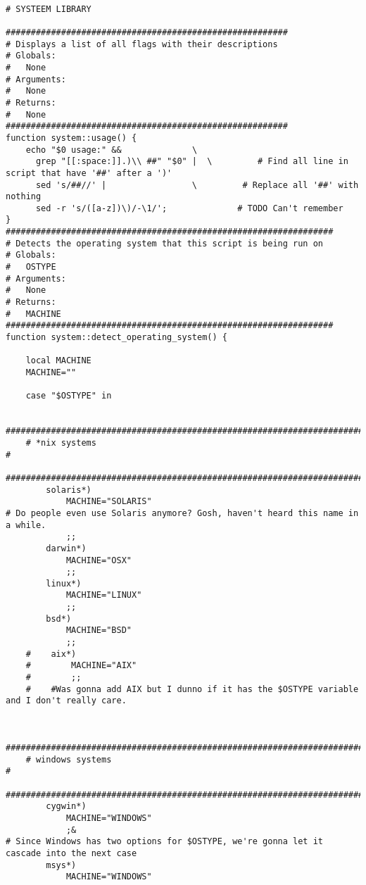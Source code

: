 \documentclass[11pt]{article}
\begin{document}
\begin{verbatim}

# SYSTEEM LIBRARY

########################################################
# Displays a list of all flags with their descriptions
# Globals:
#   None
# Arguments:
#   None
# Returns:
#   None
########################################################
function system::usage() {
    echo "$0 usage:" &&              \
      grep "[[:space:]].)\\ ##" "$0" |  \         # Find all line in script that have '##' after a ')'
      sed 's/##//' |                 \         # Replace all '##' with nothing
      sed -r 's/([a-z])\)/-\1/';              # TODO Can't remember
}
#################################################################
# Detects the operating system that this script is being run on
# Globals:
#   OSTYPE
# Arguments:
#   None
# Returns:
#   MACHINE
#################################################################
function system::detect_operating_system() {

    local MACHINE
    MACHINE=""

    case "$OSTYPE" in

    #########################################################################
    # *nix systems                                                          #
    #########################################################################
        solaris*)
            MACHINE="SOLARIS"                                                     # Do people even use Solaris anymore? Gosh, haven't heard this name in a while.
            ;;
        darwin*)
            MACHINE="OSX"
            ;;
        linux*)
            MACHINE="LINUX"
            ;;
        bsd*)
            MACHINE="BSD"
            ;;
    #    aix*)
    #        MACHINE="AIX"
    #        ;;
    #    #Was gonna add AIX but I dunno if it has the $OSTYPE variable and I don't really care.


    #########################################################################
    # windows systems                                                       #
    #########################################################################
        cygwin*)
            MACHINE="WINDOWS"
            ;&                                                                    # Since Windows has two options for $OSTYPE, we're gonna let it cascade into the next case
        msys*)
            MACHINE="WINDOWS"


\end{verbatim}
\end{document}
